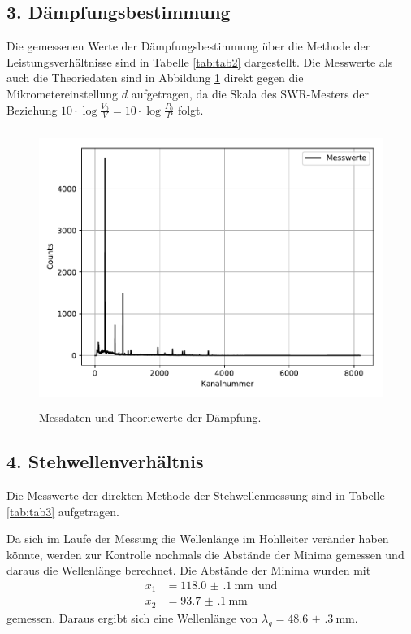 \subsection{3. Dämpfungsbestimmung}

Die gemessenen Werte der Dämpfungsbestimmung über die Methode der Leistungsverhältnisse sind
in Tabelle \ref{tab:tab2} dargestellt. Die Messwerte als auch die Theoriedaten sind in Abbildung \ref{fig:plot1}
direkt gegen die Mikrometereinstellung $d$ aufgetragen, da die Skala des SWR-Mesters der Beziehung
$10\cdot\log\frac{V_0}{V}=10\cdot\log\frac{P_0}{P}$ folgt.



\begin{figure}
  \centering
  \includegraphics[height=9cm]{plot1.pdf}
  \caption{Messdaten und Theoriewerte der Dämpfung.}
  \label{fig:plot1}
\end{figure}

\subsection{4. Stehwellenverhältnis}

Die Messwerte der direkten Methode der Stehwellenmessung sind in Tabelle \ref{tab:tab3} aufgetragen.

Da sich im Laufe der Messung die Wellenlänge im Hohlleiter veränder haben könnte, werden zur Kontrolle nochmals
die Abstände der Minima gemessen und daraus die Wellenlänge berechnet. Die Abstände der Minima wurden mit
\begin{align*}
  x_1&=\SI{118.0(1)}{\mm}\:\:\text{und}\\
  x_2&=\SI{93.7(1)}{\mm}
\end{align*}
gemessen.
Daraus ergibt sich eine Wellenlänge von $\lambda_g=\SI{48.6(3)}{\mm}$.\\

